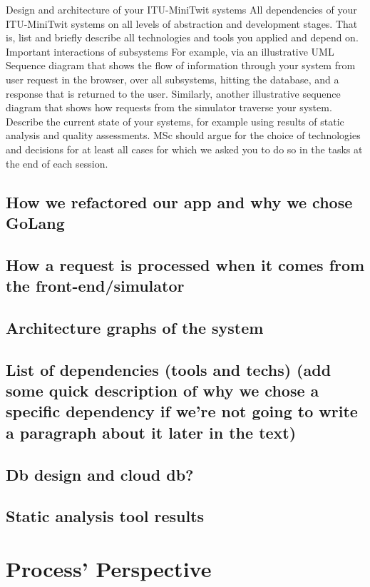 \documentclass{article}
\begin{document}
Design and architecture of your ITU-MiniTwit systems
All dependencies of your ITU-MiniTwit systems on all levels of abstraction and development stages. That is, list and briefly describe all technologies and tools you applied and depend on.
Important interactions of subsystems
For example, via an illustrative UML Sequence diagram that shows the flow of information through your system from user request in the browser, over all subsystems, hitting the database, and a response that is returned to the user.
Similarly, another illustrative sequence diagram that shows how requests from the simulator traverse your system.
Describe the current state of your systems, for example using results of static analysis and quality assessments.
MSc should argue for the choice of technologies and decisions for at least all cases for which we asked you to do so in the tasks at the end of each session.

\subsection{How we refactored our app and why we chose GoLang}
\subsection{How a request is processed when it comes from the front-end/simulator}
\subsection{Architecture graphs of the system}
\subsection{List of dependencies (tools and techs) (add some quick description of why we chose a specific dependency if we're not going to write a paragraph about it later in the text)}
\subsection{Db design and cloud db?}
\subsection{Static analysis tool results}

\section{Process' Perspective}
\end{document}
